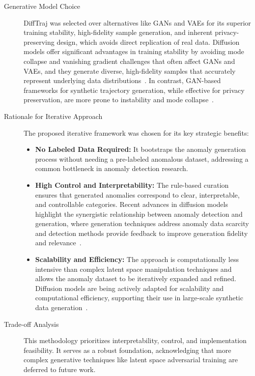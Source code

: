 \documentclass[runningheads]{llncs}
\begin{document}
\begin{description}
    \item[Generative Model Choice] DiffTraj was selected over alternatives like GANs and VAEs for its superior training stability, high-fidelity sample generation, and inherent privacy-preserving design, which avoids direct replication of real data. Diffusion models offer significant advantages in training stability by avoiding mode collapse and vanishing gradient challenges that often affect GANs and VAEs, and they generate diverse, high-fidelity samples that accurately represent underlying data distributions~\cite{liuAnomalyDetectionGeneration2025}. In contrast, GAN-based frameworks for synthetic trajectory generation, while effective for privacy preservation, are more prone to instability and mode collapse~\cite{zhang2022gan}.
    \item[Rationale for Iterative Approach] The proposed iterative framework was chosen for its key strategic benefits:
        \begin{itemize}[leftmargin=*]
            \item \textbf{No Labeled Data Required:} It bootstraps the anomaly generation process without needing a pre-labeled anomalous dataset, addressing a common bottleneck in anomaly detection research.
            \item \textbf{High Control and Interpretability:} The rule-based curation ensures that generated anomalies correspond to clear, interpretable, and controllable categories. Recent advances in diffusion models highlight the synergistic relationship between anomaly detection and generation, where generation techniques address anomaly data scarcity and detection methods provide feedback to improve generation fidelity and relevance~\cite{liuAnomalyDetectionGeneration2025}.
            \item \textbf{Scalability and Efficiency:} The approach is computationally less intensive than complex latent space manipulation techniques and allows the anomaly dataset to be iteratively expanded and refined. Diffusion models are being actively adapted for scalability and computational efficiency, supporting their use in large-scale synthetic data generation~\cite{liuAnomalyDetectionGeneration2025}.
        \end{itemize}
    \item[Trade-off Analysis] This methodology prioritizes interpretability, control, and implementation feasibility. It serves as a robust foundation, acknowledging that more complex generative techniques like latent space adversarial training are deferred to future work.
\end{description}
\end{document}
